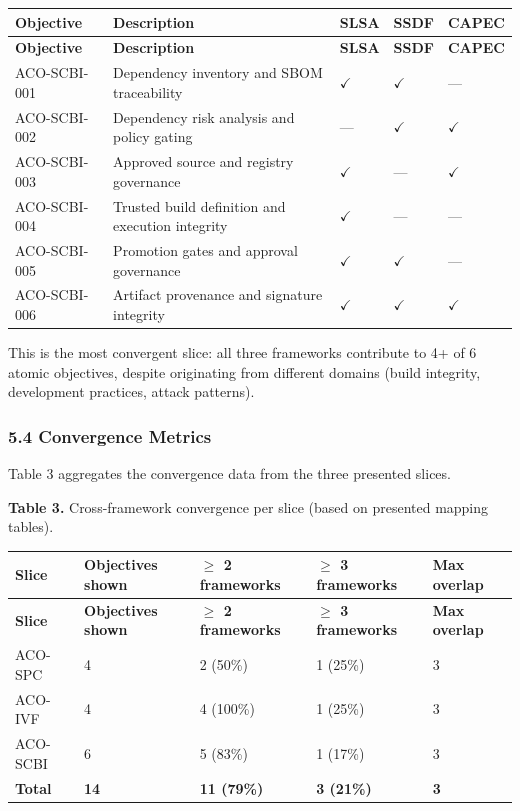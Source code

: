 \documentclass[
]{article}
\begin{document}
\begin{longtable}{@{}L{2.5cm}L{6.95cm}C{0.9cm}C{0.9cm}C{1cm}@{}}
\toprule
\textbf{Objective} & \textbf{Description} & \textbf{SLSA} & \textbf{SSDF} & \textbf{CAPEC} \\
\midrule
\endfirsthead
\toprule
\textbf{Objective} & \textbf{Description} & \textbf{SLSA} & \textbf{SSDF} & \textbf{CAPEC} \\
\midrule
\endhead
\bottomrule
\endfoot
\bottomrule
\endlastfoot
ACO-SCBI-001 & Dependency inventory and SBOM traceability & $\checkmark$ & $\checkmark$ & --- \\
ACO-SCBI-002 & Dependency risk analysis and policy gating & --- & $\checkmark$ & $\checkmark$ \\
ACO-SCBI-003 & Approved source and registry governance & $\checkmark$ & --- & $\checkmark$ \\
ACO-SCBI-004 & Trusted build definition and execution integrity & $\checkmark$ & --- & --- \\
ACO-SCBI-005 & Promotion gates and approval governance & $\checkmark$ & $\checkmark$ & --- \\
ACO-SCBI-006 & Artifact provenance and signature integrity & $\checkmark$ & $\checkmark$ & $\checkmark$ \\
\end{longtable}

This is the most convergent slice: all three frameworks contribute to 4+
of 6 atomic objectives, despite originating from different domains
(build integrity, development practices, attack patterns).

\subsubsection{5.4 Convergence Metrics}\label{convergence-metrics}

Table 3 aggregates the convergence data from the three presented slices.

\textbf{Table 3.} Cross-framework convergence per slice (based on
presented mapping tables).

\begin{longtable}{@{}L{2.2cm}C{2.3cm}C{2.8cm}C{2.8cm}C{2cm}@{}}
\toprule
\textbf{Slice} & \textbf{Objectives shown} & \textbf{$\geq$ 2 frameworks} & \textbf{$\geq$ 3 frameworks} & \textbf{Max overlap} \\
\midrule
\endfirsthead
\toprule
\textbf{Slice} & \textbf{Objectives shown} & \textbf{$\geq$ 2 frameworks} & \textbf{$\geq$ 3 frameworks} & \textbf{Max overlap} \\
\midrule
\endhead
\bottomrule
\endfoot
\bottomrule
\endlastfoot
ACO-SPC & 4 & 2 (50\%) & 1 (25\%) & 3 \\
ACO-IVF & 4 & 4 (100\%) & 1 (25\%) & 3 \\
ACO-SCBI & 6 & 5 (83\%) & 1 (17\%) & 3 \\
\textbf{Total} & \textbf{14} & \textbf{11 (79\%)} & \textbf{3 (21\%)} & \textbf{3} \\
\end{longtable}
\end{document}
